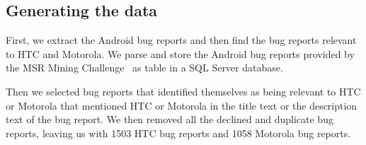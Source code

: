 \documentclass[10pt, conference, compsocconf]{IEEEtran}
\begin{document}
\subsection{Generating the data}


First, we
extract the Android bug reports and then find
the bug reports relevant to HTC and Motorola.  We parse and store the
Android bug reports provided by the MSR Mining
Challenge~\cite{MSRChallenge2012} as table in a SQL Server database.


Then we selected bug reports that identified themselves as being
relevant to HTC or Motorola that mentioned HTC or
Motorola in the title text or the description text of the bug report.  
We then removed all the declined and duplicate bug reports, leaving us
with 1503 HTC bug reports and 1058 Motorola bug reports.
\end{document}
